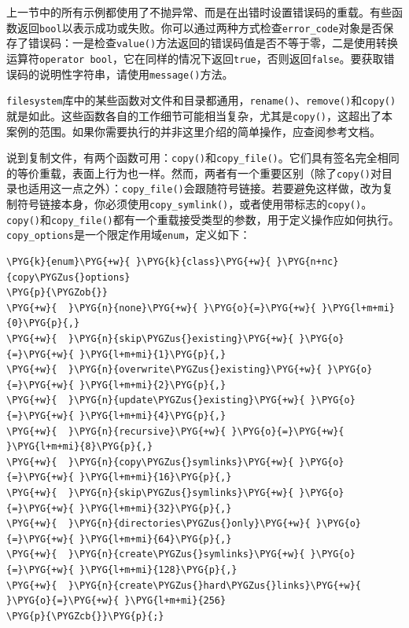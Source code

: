 
上一节中的所有示例都使用了不抛异常、而是在出错时设置错误码的重载。有些函数返回\texttt{bool}以表示成功或失败。你可以通过两种方式检查\texttt{error\_\allowbreak{}code}对象是否保存了错误码：一是检查\texttt{value()}方法返回的错误码值是否不等于零，二是使用转换运算符\texttt{operator bool}，它在同样的情况下返回\texttt{true}，否则返回\texttt{false}。要获取错误码的说明性字符串，请使用\texttt{message()}方法。



\texttt{filesystem}库中的某些函数对文件和目录都通用，\texttt{rename()}、\texttt{remove()}和\texttt{copy()}就是如此。这些函数各自的工作细节可能相当复杂，尤其是\texttt{copy()}，这超出了本案例的范围。如果你需要执行的并非这里介绍的简单操作，应查阅参考文档。



说到复制文件，有两个函数可用：\texttt{copy()}和\texttt{copy\_\allowbreak{}file()}。它们具有签名完全相同的等价重载，表面上行为也一样。然而，两者有一个重要区别（除了\texttt{copy()}对目录也适用这一点之外）：\texttt{copy\_\allowbreak{}file()}会跟随符号链接。若要避免这样做，改为复制符号链接本身，你必须使用\texttt{copy\_\allowbreak{}symlink()}，或者使用带标志的\texttt{copy()}。\texttt{copy()}和\texttt{copy\_\allowbreak{}file()}都有一个重载接受类型的参数，用于定义操作应如何执行。\texttt{copy\_\allowbreak{}options}是一个限定作用域\texttt{enum}，定义如下：



\begin{codeblockbg}
\begin{Verbatim}[commandchars=\\\{\},breaklines=true,breakanywhere=true,fontsize=\codefont,xleftmargin=17bp]
\PYG{k}{enum}\PYG{+w}{ }\PYG{k}{class}\PYG{+w}{ }\PYG{n+nc}{copy\PYGZus{}options}
\PYG{p}{\PYGZob{}}
\PYG{+w}{  }\PYG{n}{none}\PYG{+w}{ }\PYG{o}{=}\PYG{+w}{ }\PYG{l+m+mi}{0}\PYG{p}{,}
\PYG{+w}{  }\PYG{n}{skip\PYGZus{}existing}\PYG{+w}{ }\PYG{o}{=}\PYG{+w}{ }\PYG{l+m+mi}{1}\PYG{p}{,}
\PYG{+w}{  }\PYG{n}{overwrite\PYGZus{}existing}\PYG{+w}{ }\PYG{o}{=}\PYG{+w}{ }\PYG{l+m+mi}{2}\PYG{p}{,}
\PYG{+w}{  }\PYG{n}{update\PYGZus{}existing}\PYG{+w}{ }\PYG{o}{=}\PYG{+w}{ }\PYG{l+m+mi}{4}\PYG{p}{,}
\PYG{+w}{  }\PYG{n}{recursive}\PYG{+w}{ }\PYG{o}{=}\PYG{+w}{ }\PYG{l+m+mi}{8}\PYG{p}{,}
\PYG{+w}{  }\PYG{n}{copy\PYGZus{}symlinks}\PYG{+w}{ }\PYG{o}{=}\PYG{+w}{ }\PYG{l+m+mi}{16}\PYG{p}{,}
\PYG{+w}{  }\PYG{n}{skip\PYGZus{}symlinks}\PYG{+w}{ }\PYG{o}{=}\PYG{+w}{ }\PYG{l+m+mi}{32}\PYG{p}{,}
\PYG{+w}{  }\PYG{n}{directories\PYGZus{}only}\PYG{+w}{ }\PYG{o}{=}\PYG{+w}{ }\PYG{l+m+mi}{64}\PYG{p}{,}
\PYG{+w}{  }\PYG{n}{create\PYGZus{}symlinks}\PYG{+w}{ }\PYG{o}{=}\PYG{+w}{ }\PYG{l+m+mi}{128}\PYG{p}{,}
\PYG{+w}{  }\PYG{n}{create\PYGZus{}hard\PYGZus{}links}\PYG{+w}{ }\PYG{o}{=}\PYG{+w}{ }\PYG{l+m+mi}{256}
\PYG{p}{\PYGZcb{}}\PYG{p}{;}
\end{Verbatim}
\end{codeblockbg}


